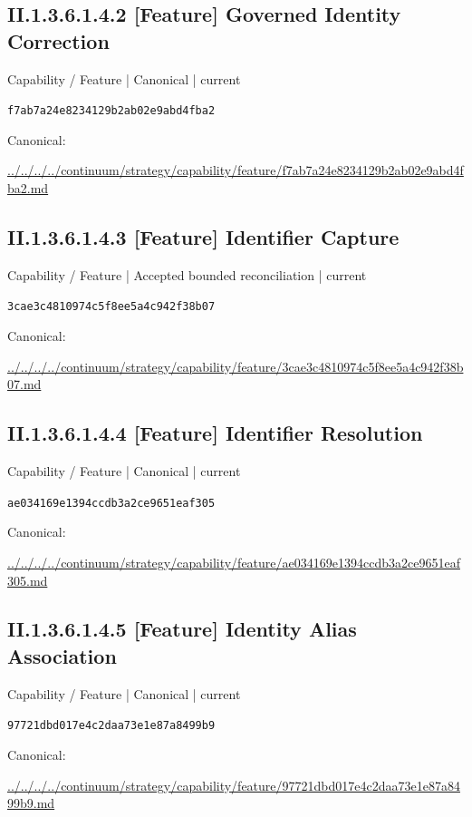 \documentclass[10pt,a4paper]{article}
\begin{document}
\subsection*{II.1.3.6.1.4.2 [Feature] Governed Identity Correction}
{\small Capability / Feature | Canonical | current}\par
\texttt{f7ab7a24e8234129b2ab02e9abd4fba2}\par
Canonical: \par
{\footnotesize\url{../../../../continuum/strategy/capability/feature/f7ab7a24e8234129b2ab02e9abd4fba2.md}}\par
\subsection*{II.1.3.6.1.4.3 [Feature] Identifier Capture}
{\small Capability / Feature | Accepted bounded reconciliation | current}\par
\texttt{3cae3c4810974c5f8ee5a4c942f38b07}\par
Canonical: \par
{\footnotesize\url{../../../../continuum/strategy/capability/feature/3cae3c4810974c5f8ee5a4c942f38b07.md}}\par
\subsection*{II.1.3.6.1.4.4 [Feature] Identifier Resolution}
{\small Capability / Feature | Canonical | current}\par
\texttt{ae034169e1394ccdb3a2ce9651eaf305}\par
Canonical: \par
{\footnotesize\url{../../../../continuum/strategy/capability/feature/ae034169e1394ccdb3a2ce9651eaf305.md}}\par
\subsection*{II.1.3.6.1.4.5 [Feature] Identity Alias Association}
{\small Capability / Feature | Canonical | current}\par
\texttt{97721dbd017e4c2daa73e1e87a8499b9}\par
Canonical: \par
{\footnotesize\url{../../../../continuum/strategy/capability/feature/97721dbd017e4c2daa73e1e87a8499b9.md}}\par
\end{document}
